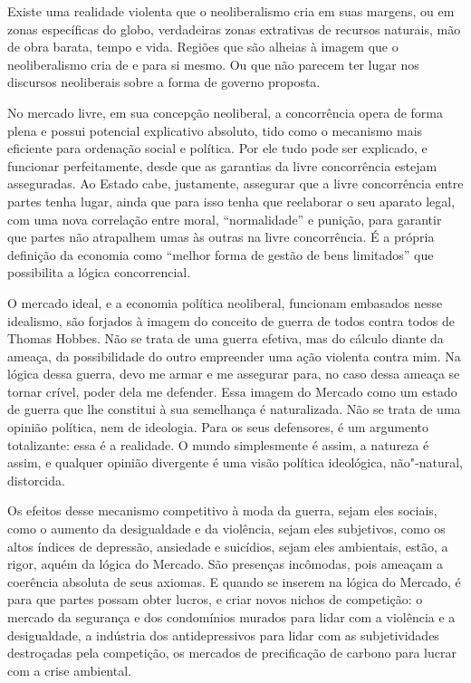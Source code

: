 Existe uma realidade violenta que o neoliberalismo cria em suas margens,
ou em zonas específicas do globo, verdadeiras zonas extrativas de
recursos naturais, mão de obra barata, tempo e vida. Regiões que são
alheias à imagem que o neoliberalismo cria de e para si mesmo. Ou que não
parecem ter lugar nos discursos neoliberais sobre a forma de governo
proposta.

\asterisc

No mercado livre, em sua concepção neoliberal, a concorrência opera de
forma plena e possui potencial explicativo absoluto, tido como o
mecanismo mais eficiente para ordenação social e política. Por ele tudo
pode ser explicado, e funcionar perfeitamente, desde que as garantias da
livre concorrência estejam asseguradas. Ao Estado cabe, justamente,
assegurar que a livre concorrência entre partes tenha lugar, ainda que
para isso tenha que reelaborar o seu aparato legal, com uma nova
correlação entre moral, ``normalidade'' e punição, para garantir que
partes não atrapalhem umas às outras na livre concorrência. É a própria
definição da economia como ``melhor forma de gestão de bens limitados''
que possibilita a lógica concorrencial.

O mercado ideal, e a economia política neoliberal, funcionam embasados
nesse idealismo, são forjados à imagem do conceito de guerra de todos
contra todos de Thomas Hobbes. Não se trata de uma guerra efetiva, mas
do cálculo diante da ameaça, da possibilidade do outro empreender uma
ação violenta contra mim. Na lógica dessa guerra, devo me armar e me
assegurar para, no caso dessa ameaça se tornar crível, poder dela me
defender. Essa imagem do Mercado como um estado de guerra que lhe
constitui à sua semelhança é naturalizada. Não se trata de uma opinião
política, nem de ideologia. Para os seus defensores, é um argumento
totalizante: essa é a realidade. O mundo simplesmente é assim, a
natureza é assim, e qualquer opinião divergente é uma visão política
ideológica, não"-natural, distorcida.

Os efeitos desse mecanismo competitivo à moda da guerra, sejam eles
sociais, como o aumento da desigualdade e da violência, sejam eles
subjetivos, como os altos índices de depressão, ansiedade e suicídios,
sejam eles ambientais, estão, a rigor, aquém da lógica do Mercado. São
presenças incômodas, pois ameaçam a coerência absoluta de seus axiomas.
E quando se inserem na lógica do Mercado, é para que partes possam obter
lucros, e criar novos nichos de competição: o mercado da segurança e dos
condomínios murados para lidar com a violência e a desigualdade, a
indústria dos antidepressivos para lidar com as subjetividades
destroçadas pela competição, os mercados de precificação de carbono para
lucrar com a crise ambiental.

